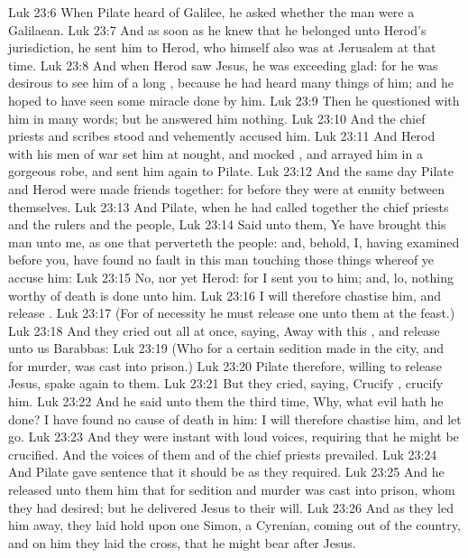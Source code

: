 \vs Luk 23:6 When Pilate heard of Galilee, he asked whether the man were a Galilaean.
\vs Luk 23:7 And as soon as he knew that he belonged unto Herod's jurisdiction, he sent him to Herod, who himself also was at Jerusalem at that time.
\vs Luk 23:8 And when Herod saw Jesus, he was exceeding glad: for he was desirous to see him of a long , because he had heard many things of him; and he hoped to have seen some miracle done by him.
\vs Luk 23:9 Then he questioned with him in many words; but he answered him nothing.
\vs Luk 23:10 And the chief priests and scribes stood and vehemently accused him.
\vs Luk 23:11 And Herod with his men of war set him at nought, and mocked , and arrayed him in a gorgeous robe, and sent him again to Pilate.
\vs Luk 23:12 And the same day Pilate and Herod were made friends together: for before they were at enmity between themselves.
\vs Luk 23:13 And Pilate, when he had called together the chief priests and the rulers and the people,
\vs Luk 23:14 Said unto them, Ye have brought this man unto me, as one that perverteth the people: and, behold, I, having examined  before you, have found no fault in this man touching those things whereof ye accuse him:
\vs Luk 23:15 No, nor yet Herod: for I sent you to him; and, lo, nothing worthy of death is done unto him.
\vs Luk 23:16 I will therefore chastise him, and release .
\vs Luk 23:17 (For of necessity he must release one unto them at the feast.)
\vs Luk 23:18 And they cried out all at once, saying, Away with this , and release unto us Barabbas:
\vs Luk 23:19 (Who for a certain sedition made in the city, and for murder, was cast into prison.)
\vs Luk 23:20 Pilate therefore, willing to release Jesus, spake again to them.
\vs Luk 23:21 But they cried, saying, Crucify , crucify him.
\vs Luk 23:22 And he said unto them the third time, Why, what evil hath he done? I have found no cause of death in him: I will therefore chastise him, and let  go.
\vs Luk 23:23 And they were instant with loud voices, requiring that he might be crucified. And the voices of them and of the chief priests prevailed.
\vs Luk 23:24 And Pilate gave sentence that it should be as they required.
\vs Luk 23:25 And he released unto them him that for sedition and murder was cast into prison, whom they had desired; but he delivered Jesus to their will.
\vs Luk 23:26 And as they led him away, they laid hold upon one Simon, a Cyrenian, coming out of the country, and on him they laid the cross, that he might bear  after Jesus.
